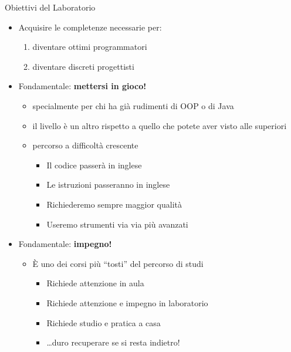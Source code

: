 \documentclass[presentation]{beamer}
\begin{document}
\begin{frame}{Obiettivi del Laboratorio}
    \begin{itemize}
        \item Acquisire le completenze necessarie per:
        \begin{enumerate}
            \item diventare ottimi programmatori
            \item diventare discreti progettisti
        \end{enumerate}
        \item Fondamentale: \textbf{mettersi in gioco!}
        \begin{itemize}
            \item specialmente per chi ha già rudimenti di OOP o di Java
            \item il livello è un altro rispetto a quello che potete aver visto alle superiori
            \item percorso a difficoltà crescente
            \begin{itemize}
                \item Il codice passerà in inglese
                \item Le istruzioni passeranno in inglese
                \item Richiederemo sempre maggior qualità
                \item Useremo strumenti via via più avanzati
            \end{itemize}
        \end{itemize}
        \item Fondamentale: \textbf{impegno!}
        \begin{itemize}
            \item È uno dei corsi più ``tosti'' del percorso di studi
            \begin{itemize}
                \item Richiede attenzione in aula
                \item Richiede attenzione e impegno in laboratorio
                \item Richiede studio e pratica a casa
                \item \dots{}duro recuperare se si resta indietro!
            \end{itemize}
        \end{itemize}
    \end{itemize}
\end{frame}
\end{document}
